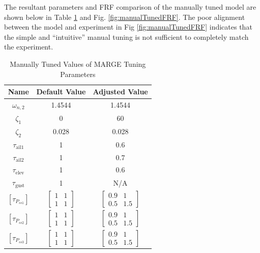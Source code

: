The resultant parameters and FRF comparison of the manually tuned model are shown below in Table \ref{tab:manualTuning} and Fig. \ref{fig:manualTunedFRF}. The poor alignment between the model and experiment in Fig \ref{fig:manualTunedFRF} indicates that the simple and ``intuitive'' manual tuning is not sufficient to completely match the experiment.
\begin{table}[h]
	\centering
	\label{tab:manualTuning}
	\caption{Manually Tuned Values of MARGE Tuning Parameters}
	\begin{tabular}{ccc}
		\hline\hline
		Name & Default Value & Adjusted Value \\
		\hline
		$\omega_{n,2}$ & 1.4544 & 1.4544 \\
		$\zeta_1$ & 0 & 60 \\
		$\zeta_2$ & 0.028 & 0.028 \\
		$\tau_\text{ail1}$ & 1 & 0.6 \\
		$\tau_\text{ail2}$ & 1 & 0.7 \\
		$\tau_\text{elev}$ & 1 & 0.6 \\
		$\tau_\text{gust}$ & 1 & N/A \\
		$\left[\tau_{P_{ss1}}\right]$ & $\begin{bmatrix} 1 & 1 \\ 1 & 1 \end{bmatrix}$ & $\begin{bmatrix} 0.9 & 1 \\ 0.5 & 1.5 \end{bmatrix}$ \\
		$\left[\tau_{P_{ss2}}\right]$ & $\begin{bmatrix} 1 & 1 \\ 1 & 1 \end{bmatrix}$ & $\begin{bmatrix} 0.9 & 1 \\ 0.5 & 1.5 \end{bmatrix}$ \\
		$\left[\tau_{P_{ss3}}\right]$ & $\begin{bmatrix} 1 & 1 \\ 1 & 1 \end{bmatrix}$ & $\begin{bmatrix} 0.9 & 1 \\ 0.5 & 1.5 \end{bmatrix}$ \\
		\hline\hline
	\end{tabular}
\end{table}

